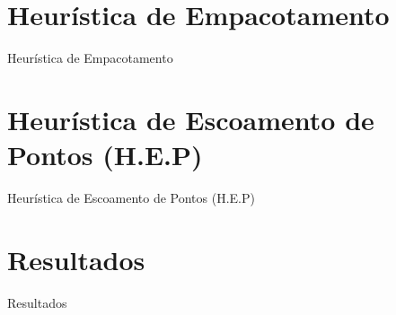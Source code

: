 \documentclass[12pt]{beamer}
\begin{document}
\section{Heur\'istica de Empacotamento} %
	\begin{frame}{Heur\'istica de Empacotamento}
\end{frame}
\section{Heur\'istica de Escoamento de Pontos (H.E.P)} %
	\begin{frame}{Heur\'istica de Escoamento de Pontos (H.E.P)}
\end{frame}
\section{Resultados} %
	\begin{frame}{Resultados}
\end{frame}

	
	
	
	
\end{document}
